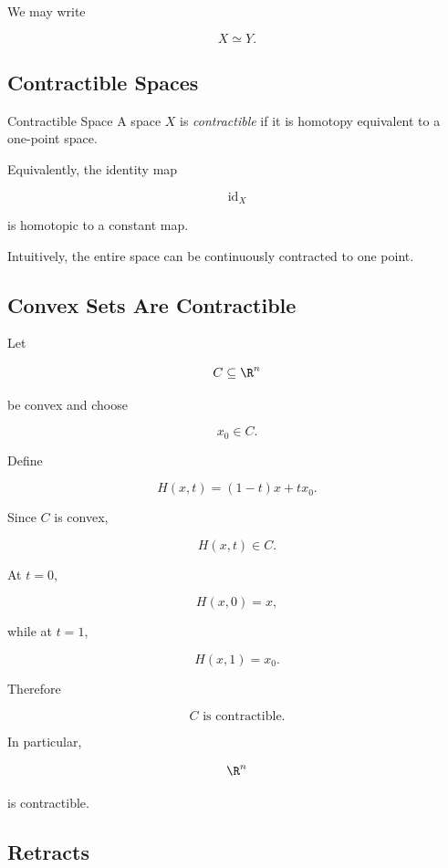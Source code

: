 We may write

\[
\boxed{
X\simeq Y.
}
\]

\subsection{Contractible Spaces}
\label{subsec:contractible-spaces}

\begin{definitionbox}{Contractible Space}
A space \(X\) is \emph{contractible} if it is homotopy equivalent to a
one-point space.
\end{definitionbox}

Equivalently, the identity map

\[
\operatorname{id}_X
\]

is homotopic to a constant map.

Intuitively, the entire space can be continuously contracted to one point.

\subsection{Convex Sets Are Contractible}
\label{subsec:convex-contractible}

Let

\[
C\subseteq\R^n
\]

be convex and choose

\[
x_0\in C.
\]

Define

\[
\boxed{
H(x,t)
=
(1-t)x+t x_0.
}
\]

Since \(C\) is convex,

\[
H(x,t)\in C.
\]

At \(t=0\),

\[
H(x,0)=x,
\]

while at \(t=1\),

\[
H(x,1)=x_0.
\]

Therefore

\[
\boxed{
C\text{ is contractible}.
}
\]

In particular,

\[
\R^n
\]

is contractible.

\subsection{Retracts}
\label{subsec:retracts}

